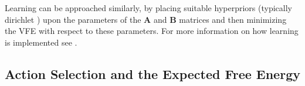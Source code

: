 Learning can be approached similarly, by placing suitable hyperpriors (typically dirichlet \citep{schwartenbeck_computational_2019}) upon the parameters of the $\bm{A}$ and $\bm{B}$ matrices and then minimizing the VFE with respect to these parameters. For more information on how learning is implemented see \citet{da2020active,friston2017process}.


\subsection{Action Selection and the Expected Free Energy}



